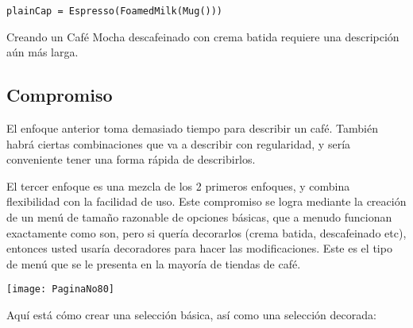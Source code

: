 \begin{lstlisting} 
plainCap = Espresso(FoamedMilk(Mug()))
\end{lstlisting}

Creando un Café Mocha descafeinado con crema batida requiere una descripción aún más larga. \newline


\subsection*{Compromiso}
\label{subsec:c}

El enfoque anterior toma demasiado tiempo para describir un café. También habrá ciertas combinaciones que va a describir con regularidad, y sería conveniente tener una forma rápida de describirlos.     \newline

El tercer enfoque es una mezcla de los 2 primeros enfoques, y combina flexibilidad con la facilidad de uso. Este compromiso se logra mediante la creación de un menú de tamaño razonable de opciones básicas, que a menudo funcionan exactamente como son, pero si quería decorarlos (crema batida, descafeinado etc), entonces usted usaría decoradores para hacer las modificaciones. Este es el tipo de menú que se le presenta en la mayoría de tiendas de café.    \newline

\texttt{[image: PaginaNo80]}

Aquí está cómo crear una selección básica, así como una selección decorada:     \newline

